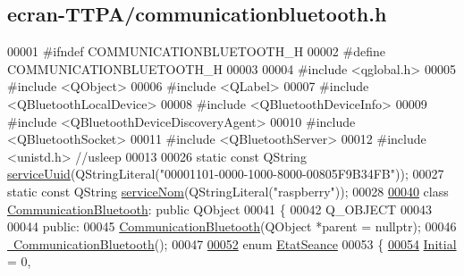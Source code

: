 \hypertarget{ecran-_t_t_p_a_2communicationbluetooth_8h_source}{}\subsection{ecran-\/\+T\+T\+P\+A/communicationbluetooth.h}
\label{ecran-_t_t_p_a_2communicationbluetooth_8h_source}

\begin{DoxyCode}
00001 \textcolor{preprocessor}{#ifndef COMMUNICATIONBLUETOOTH\_H}
00002 \textcolor{preprocessor}{#define COMMUNICATIONBLUETOOTH\_H}
00003 
00004 \textcolor{preprocessor}{#include <qglobal.h>}
00005 \textcolor{preprocessor}{#include <QObject>}
00006 \textcolor{preprocessor}{#include <QLabel>}
00007 \textcolor{preprocessor}{#include <QBluetoothLocalDevice>}
00008 \textcolor{preprocessor}{#include <QBluetoothDeviceInfo>}
00009 \textcolor{preprocessor}{#include <QBluetoothDeviceDiscoveryAgent>}
00010 \textcolor{preprocessor}{#include <QBluetoothSocket>}
00011 \textcolor{preprocessor}{#include <QBluetoothServer>}
00012 \textcolor{preprocessor}{#include <unistd.h>} \textcolor{comment}{//usleep}
00013 
00026 \textcolor{keyword}{static} \textcolor{keyword}{const} QString \hyperlink{ecran-_t_t_p_a_2communicationbluetooth_8h_a89b03bf9986896053fdab3d4f80d7c04}{serviceUuid}(QStringLiteral(\textcolor{stringliteral}{"00001101-0000-1000-8000-00805F9B34FB"}));
00027 \textcolor{keyword}{static} \textcolor{keyword}{const} QString \hyperlink{ecran-_t_t_p_a_2communicationbluetooth_8h_a0b0819170cad3a534c62951bcbe70436}{serviceNom}(QStringLiteral(\textcolor{stringliteral}{"raspberry"}));
00028 
\hyperlink{class_communication_bluetooth}{00040} \textcolor{keyword}{class }\hyperlink{class_communication_bluetooth}{CommunicationBluetooth}: \textcolor{keyword}{public} QObject
00041 \{
00042     Q\_OBJECT
00043 
00044     \textcolor{keyword}{public}:
00045         \hyperlink{class_communication_bluetooth_ae1c3be7b0a32ee1142d958bad3d7c571}{CommunicationBluetooth}(QObject *parent = \textcolor{keyword}{nullptr});
00046         \hyperlink{class_communication_bluetooth_a13c72d24359f40c204e94f3ef1ab6fd3}{~CommunicationBluetooth}();
00047 
\hyperlink{class_communication_bluetooth_a49447c8601e9214495f61f4f393e2133}{00052}         \textcolor{keyword}{enum} \hyperlink{class_communication_bluetooth_a49447c8601e9214495f61f4f393e2133}{EtatSeance}
00053         \{
\hyperlink{class_communication_bluetooth_a414353c68cf4b316937d7c929f20d22aa487b75f166d1b0c9b3f47fab1692c024}{00054}             \hyperlink{class_communication_bluetooth_a414353c68cf4b316937d7c929f20d22aa487b75f166d1b0c9b3f47fab1692c024}{Initial} = 0,

\end{DoxyCode}
